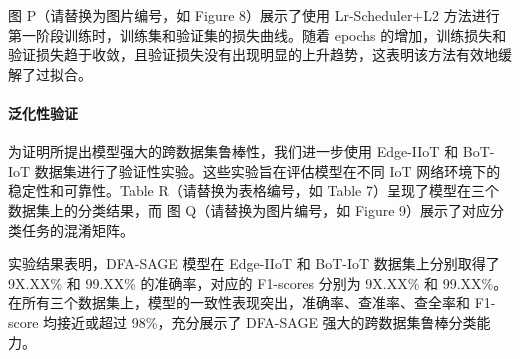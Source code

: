 \documentclass{article}
\begin{document}
图 P（请替换为图片编号，如 Figure 8）展示了使用 Lr-Scheduler+L2 方法进行第一阶段训练时，训练集和验证集的损失曲线。随着 epochs 的增加，训练损失和验证损失趋于收敛，且验证损失没有出现明显的上升趋势，这表明该方法有效地缓解了过拟合。

\paragraph{泛化性验证}

为证明所提出模型强大的跨数据集鲁棒性，我们进一步使用 Edge-IIoT 和 BoT-IoT 数据集进行了验证性实验。这些实验旨在评估模型在不同 IoT 网络环境下的稳定性和可靠性。Table R（请替换为表格编号，如 Table 7）呈现了模型在三个数据集上的分类结果，而 图 Q（请替换为图片编号，如 Figure 9）展示了对应分类任务的混淆矩阵。

实验结果表明，DFA-SAGE 模型在 Edge-IIoT 和 BoT-IoT 数据集上分别取得了 9X.XX\% 和 99.XX\% 的准确率，对应的 F1-scores 分别为 9X.XX\% 和 99.XX\%。在所有三个数据集上，模型的一致性表现突出，准确率、查准率、查全率和 F1-score 均接近或超过 98\%，充分展示了 DFA-SAGE 强大的跨数据集鲁棒分类能力。
\end{document}
